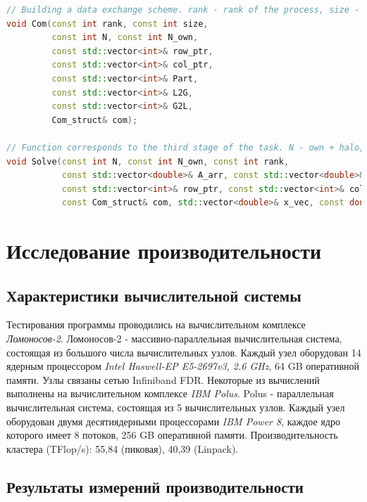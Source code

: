 \begin{lstlisting}[numbersep=10pt, language=C++, caption=\textbf{Реализованные функции}]
// Building a data exchange scheme. rank - rank of the process, size - total processes, N - own + halo, N_own - own, row_ptr, col_ptr - CSR representation, Part - ranks of vertex owners, L2G, G2L - local to global and global to local mapping, com - exchange scheme
void Com(const int rank, const int size,
         const int N, const int N_own,
         const std::vector<int>& row_ptr,
         const std::vector<int>& col_ptr,
         const std::vector<int>& Part,
         const std::vector<int>& L2G,
         const std::vector<int>& G2L,
         Com_struct& com);

// Function corresponds to the third stage of the task. N - own + halo, N_own - own, A_arr, b_vec - initial data for solving systems of linear equations, row_ptr, col_ptr - CSR representation, x_vec - equations solution, TOL - relative error of the solution
void Solve(const int N, const int N_own, const int rank,
	       const std::vector<double>& A_arr, const std::vector<double>& b_vec,
	       const std::vector<int>& row_ptr, const std::vector<int>& col_ptr,
	       const Com_struct& com, std::vector<double>& x_vec, const double TOL = 1e-7);
\end{lstlisting}

\section{Исследование производительности}
	\subsection{Характеристики вычислительной системы}
	Тестирования программы проводились на вычислительном комплексе \textit{Ломоносов-2}. Ломоносов-2 - массивно-параллельная вычислительная система, состоящая из большого числа вычислительных узлов. Каждый узел оборудован 14 ядерным процессором \textit{Intel Haswell-EP E5-2697v3, 2.6 GHz}, 64 GB оперативной памяти. Узлы связаны сетью Infiniband FDR.
	Некоторые из вычислений выполнены на вычислительном комплексе \textit{IBM Polus}. Polus - параллельная вычислительная система, состоящая из 5 вычислительных узлов. Каждый узел оборудован двумя десятиядерными процессорами \textit{IBM Power 8}, каждое ядро которого имеет 8 потоков, 256 GB оперативной памяти. Производительность кластера (TFlop/s): 55,84 (пиковая), 40,39 (Linpack).
	\subsection{Результаты измерений производительности}
